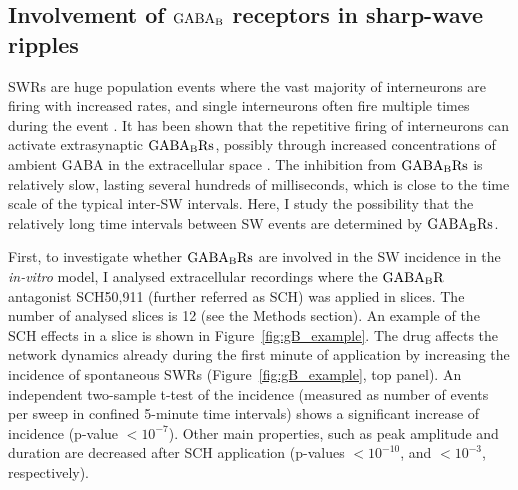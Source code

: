   \subsection{Involvement of $\rm GABA_B$ receptors in sharp-wave ripples}
    SWRs are huge population events where the vast majority of interneurons are
    firing with increased rates, and single interneurons often fire multiple
    times during the event \citep{Klausberger2009, Hajos2013}. It has been
    shown that the repetitive firing of interneurons can activate extrasynaptic
    $\rm GABA_BRs$, possibly through increased concentrations of ambient GABA
    in the extracellular space \citep{Scanziani2000, Wang2010}. The inhibition
    from $\rm GABA_B Rs$ is relatively slow, lasting several hundreds of
    milliseconds, which is close to the time scale of the typical inter-SW
    intervals. Here, I study the possibility that the relatively long time
    intervals between SW events are determined by $\rm GABA_B Rs$.

    First, to investigate whether $\rm GABA_BRs$ are involved in the SW
    incidence in the {\textit{in-vitro}} model, I analysed extracellular
    recordings where the $\rm GABA_B R$ antagonist SCH50,911 (further referred
    as SCH) was applied in slices. The number of analysed slices is 12 (see the
    Methods section). An example of the SCH effects in a slice is shown in
    Figure~\ref{fig:gB_example}. The drug affects the network dynamics already
    during the first minute of application by increasing the incidence of
    spontaneous SWRs (Figure~\ref{fig:gB_example}, top panel). An independent
    two-sample t-test of the incidence (measured as number of events per sweep
    in confined 5-minute time intervals) shows a significant increase of
    incidence (p-value $<10^{-7}$). Other main properties, such as peak
    amplitude and duration are decreased after SCH application (p-values
    $<10^{-10}$, and $<10^{-3}$, respectively).
    
